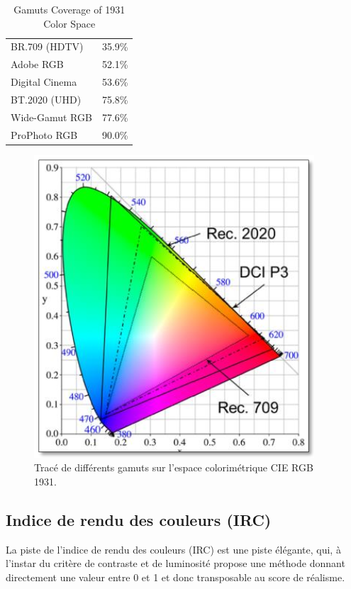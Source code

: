 	\begin{table}[h]	
		\centering
		\caption{Gamuts Coverage of 1931 Color Space}
		\label{tab:gamut}
		\small
		\begin{tabular}{ll}
			BR.709 (HDTV) & 35.9\%\\
			Adobe RGB & 52.1\%\\
			Digital Cinema & 53.6\%\\
			BT.2020 (UHD) & 75.8\%\\
			Wide-Gamut RGB & 77.6\%\\
			ProPhoto RGB & 90.0\%\\
		\end{tabular}
	\end{table}
	
	\begin{figure}
		\centering
		\includegraphics[scale=.9]{Figures/GamutBT2020}
		\caption{Tracé de différents gamuts sur l'espace colorimétrique CIE RGB 1931.}
		\label{fig:multi_gamut}
	\end{figure}
	
	\subsection{Indice de rendu des couleurs (IRC)}
	\par La piste de l'indice de rendu des couleurs (IRC) est une piste élégante, qui, à l'instar du critère de contraste et de luminosité propose une méthode donnant directement une valeur entre 0 et 1 et donc transposable au score de réalisme.
	
